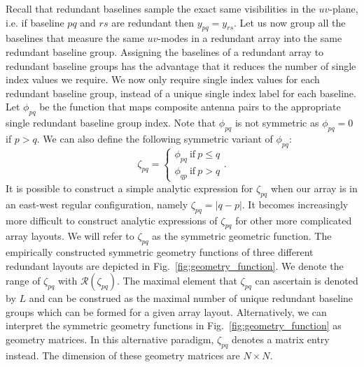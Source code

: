 \documentclass[useAMS,usenatbib]{mn2e}
\begin{document}
Recall that redundant baselines sample the exact same visibilities in the $uv$-plane, i.e. if baseline $pq$ and $rs$ are redundant then $y_{pq} = y_{rs}$. 
Let us now group all the baselines that measure the same $uv$-modes in a redundant array into the same redundant baseline group. Assigning the baselines of a redundant array to redundant baseline groups has the advantage that it reduces the number of single index values we require. We now only require single index values for each redundant baseline group, instead of a unique single index label for 
each baseline. Let $\phi_{pq}$ be the function that maps composite antenna pairs to the appropriate single redundant baseline group index. Note that $\phi_{pq}$ is not symmetric as 
$\phi_{pq} = 0$ if $p>q$. We can also define the following symmetric variant of $\phi_{pq}$:
\begin{equation}
\zeta_{pq} = 
\begin{cases}
\phi_{pq}~\textrm{if}~p \leq q\\
\phi_{qp}~\textrm{if}~p>q
\end{cases}.
\end{equation} 
It is possible to construct a simple analytic expression for $\zeta_{pq}$ when our array is in an east-west regular configuration, namely $\zeta_{pq} = |q-p|$. 
It becomes increasingly more difficult to construct analytic expressions of $\zeta_{pq}$ for other more complicated array layouts. 
We will refer to $\zeta_{pq}$ as the symmetric geometric function. The empirically constructed symmetric geometry
functions of three different redundant layouts are depicted in Fig.~\ref{fig:geometry_function}. We denote the range of $\zeta_{pq}$ with $\mathcal{R}(\zeta_{pq})$. The maximal element 
that $\zeta_{pq}$ can ascertain is denoted by $L$ and can be construed as the maximal number of unique redundant baseline groups which can be formed for a given 
array layout. Alternatively, we can interpret the symmetric geometry functions in Fig.~\ref{fig:geometry_function} as geometry matrices. In this alternative paradigm, $\zeta_{pq}$ denotes a matrix entry instead. The dimension of these geometry 
matrices are $N\times N$. 
\end{document}
